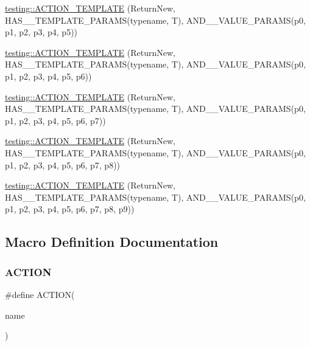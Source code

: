 \begin{DoxyCompactItemize}
\item 
\mbox{\hyperlink{namespacetesting_a2ef1b31693ee2be0bb93602b375fb9ce}{testing\+::\+A\+C\+T\+I\+O\+N\+\_\+\+T\+E\+M\+P\+L\+A\+TE}} (Return\+New, H\+A\+S\+\_\+\_\+\+T\+E\+M\+P\+L\+A\+T\+E\+\_\+\+P\+A\+R\+A\+MS(typename, T), A\+N\+D\+\_\+\_\+\+V\+A\+L\+U\+E\+\_\+\+P\+A\+R\+A\+MS(p0, p1, p2, p3, p4, p5))
\item 
\mbox{\hyperlink{namespacetesting_a7b4cfa09367e9938561eeca5a105d183}{testing\+::\+A\+C\+T\+I\+O\+N\+\_\+\+T\+E\+M\+P\+L\+A\+TE}} (Return\+New, H\+A\+S\+\_\+\_\+\+T\+E\+M\+P\+L\+A\+T\+E\+\_\+\+P\+A\+R\+A\+MS(typename, T), A\+N\+D\+\_\+\_\+\+V\+A\+L\+U\+E\+\_\+\+P\+A\+R\+A\+MS(p0, p1, p2, p3, p4, p5, p6))
\item 
\mbox{\hyperlink{namespacetesting_a76d58331453ee0a2eb75a5992e35197b}{testing\+::\+A\+C\+T\+I\+O\+N\+\_\+\+T\+E\+M\+P\+L\+A\+TE}} (Return\+New, H\+A\+S\+\_\+\_\+\+T\+E\+M\+P\+L\+A\+T\+E\+\_\+\+P\+A\+R\+A\+MS(typename, T), A\+N\+D\+\_\+\_\+\+V\+A\+L\+U\+E\+\_\+\+P\+A\+R\+A\+MS(p0, p1, p2, p3, p4, p5, p6, p7))
\item 
\mbox{\hyperlink{namespacetesting_adfb5791a941ec1f2a2f8067fd9ac7667}{testing\+::\+A\+C\+T\+I\+O\+N\+\_\+\+T\+E\+M\+P\+L\+A\+TE}} (Return\+New, H\+A\+S\+\_\+\_\+\+T\+E\+M\+P\+L\+A\+T\+E\+\_\+\+P\+A\+R\+A\+MS(typename, T), A\+N\+D\+\_\+\_\+\+V\+A\+L\+U\+E\+\_\+\+P\+A\+R\+A\+MS(p0, p1, p2, p3, p4, p5, p6, p7, p8))
\item 
\mbox{\hyperlink{namespacetesting_a3934a47f6125504c939a3573b7fc55c4}{testing\+::\+A\+C\+T\+I\+O\+N\+\_\+\+T\+E\+M\+P\+L\+A\+TE}} (Return\+New, H\+A\+S\+\_\+\_\+\+T\+E\+M\+P\+L\+A\+T\+E\+\_\+\+P\+A\+R\+A\+MS(typename, T), A\+N\+D\+\_\+\_\+\+V\+A\+L\+U\+E\+\_\+\+P\+A\+R\+A\+MS(p0, p1, p2, p3, p4, p5, p6, p7, p8, p9))
\end{DoxyCompactItemize}


\subsection{Macro Definition Documentation}
\mbox{\label{googletest-master_2googlemock_2include_2gmock_2gmock-generated-actions_8h_a7af7137aa4871df4235881af377205fe}} 
\subsubsection{\texorpdfstring{ACTION}{ACTION}}
{\footnotesize\ttfamily \#define A\+C\+T\+I\+ON(\begin{DoxyParamCaption}\item[{}]{name }\end{DoxyParamCaption})}

